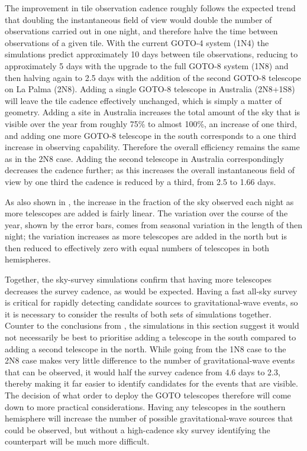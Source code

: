 \begin{colsection}
\begin{colsection}
The improvement in tile observation cadence roughly follows the expected trend that doubling the instantaneous field of view would double the number of observations carried out in one night, and therefore halve the time between observations of a given tile. With the current GOTO-4 system (1N4) the simulations predict approximately 10 days between tile observations, reducing to approximately 5 days with the upgrade to the full GOTO-8 system (1N8) and then halving again to 2.5 days with the addition of the second GOTO-8 telescope on La Palma (2N8). Adding a single GOTO-8 telescope in Australia (2N8+1S8) will leave the tile cadence effectively unchanged, which is simply a matter of geometry. Adding a site in Australia increases the total amount of the sky that is visible over the year from roughly 75\% to almost 100\%, an increase of one third, and adding one more GOTO-8 telescope in the south corresponds to a one third increase in observing capability. Therefore the overall efficiency remains the same as in the 2N8 case. Adding the second telescope in Australia correspondingly decreases the cadence further; as this increases the overall instantaneous field of view by one third the cadence is reduced by a third, from 2.5 to 1.66 days.

As also shown in , the increase in the fraction of the sky observed each night as more telescopes are added is fairly linear. The variation over the course of the year, shown by the error bars, comes from seasonal variation in the length of then night; the variation increases as more telescopes are added in the north but is then reduced to effectively zero with equal numbers of telescopes in both hemispheres.

Together, the sky-survey simulations confirm that having more telescopes decreases the survey cadence, as would be expected. Having a fast all-sky survey is critical for rapidly detecting candidate sources to gravitational-wave events, so it is necessary to consider the results of both sets of simulations together. Counter to the conclusions from , the simulations in this section suggest it would not necessarily be best to prioritise adding a telescope in the south compared to adding a second telescope in the north. While going from the 1N8 case to the 2N8 case makes very little difference to the number of gravitational-wave events that can be observed, it would half the survey cadence from 4.6 days to 2.3, thereby making it far easier to identify candidates for the events that are visible. The decision of what order to deploy the GOTO telescopes therefore will come down to more practical considerations. Having any telescopes in the southern hemisphere will increase the number of possible gravitational-wave sources that could be observed, but without a high-cadence sky survey identifying the counterpart will be much more difficult.


\end{colsection}
\end{colsection}
